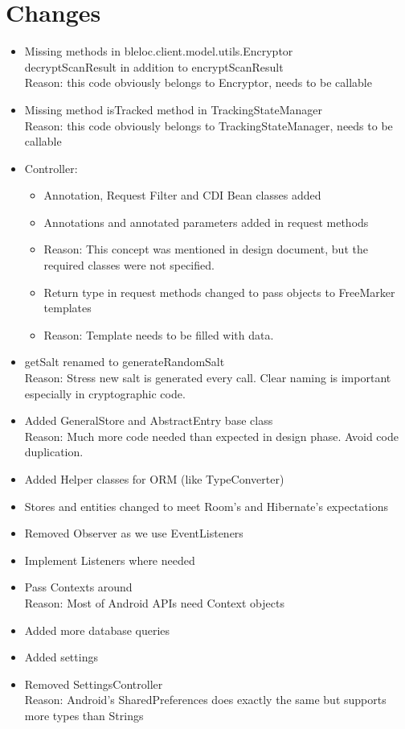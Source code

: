 \chapter{Changes}
\begin{itemize}
\item Missing methods in bleloc.client.model.utils.Encryptor \\ decryptScanResult in addition to encryptScanResult \\ Reason: this code obviously belongs to Encryptor, needs to be callable
\item Missing method isTracked method in TrackingStateManager \\ Reason: this code obviously belongs to TrackingStateManager, needs to be callable
\item Controller:
\begin{itemize}
\item Annotation, Request Filter and CDI Bean classes added
\item Annotations and annotated parameters added in request methods
\item Reason: This concept was mentioned in design document, but the required classes were not specified.
\item Return type in request methods changed to pass objects to FreeMarker templates
\item Reason: Template needs to be filled with data.
\end{itemize}
\item getSalt renamed to generateRandomSalt \\ Reason: Stress new salt is generated every call. Clear naming is important especially in cryptographic code.
\item Added GeneralStore and AbstractEntry base class \\ Reason: Much more code needed than expected in design phase. Avoid code duplication.
\item Added Helper classes for ORM (like TypeConverter)
\item Stores and entities changed to meet Room's and Hibernate's expectations
\item Removed Observer as we use EventListeners
\item Implement Listeners where needed
\item Pass Contexts around \\ Reason: Most of Android APIs need Context objects
\item Added more database queries
\item Added settings
\item Removed SettingsController \\ Reason: Android's SharedPreferences does exactly the same but supports more types than Strings
\end{itemize}
